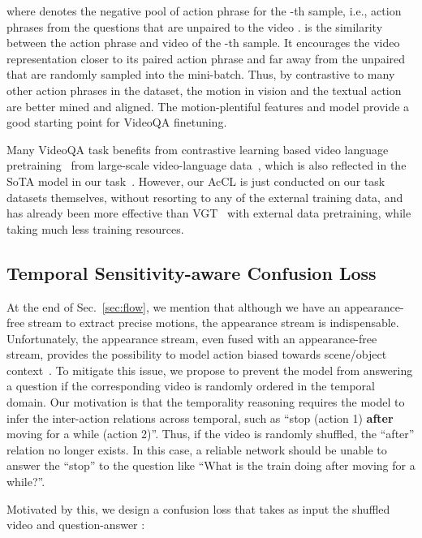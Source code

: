 \documentclass[sigconf]{acmart}
\begin{document}
where  denotes the negative pool of action phrase for the -th sample, i.e., action phrases from the questions that are unpaired to the video .  is the similarity between the action phrase  and video  of the -th sample. 
It encourages the video representation closer to its paired action phrase  and far away from the unpaired  that are randomly sampled into the mini-batch.
Thus, by contrastive to many other action phrases  in the dataset, the motion in vision and the textual action are better mined and aligned. The motion-plentiful features and model provide a good starting point for VideoQA finetuning.

Many VideoQA task benefits from contrastive learning based video language pretraining~\cite{lei2021less,zellers2021merlot} from large-scale video-language data~\cite{bain2021frozen}, which is also reflected in the SoTA model in our task~\cite{xiao2022vgt}. However, our AcCL is just conducted on our task datasets themselves, without resorting to any of the external training data, and has already been more effective than VGT~\cite{xiao2022vgt} with external data pretraining, while taking much less training resources.








\subsection{Temporal Sensitivity-aware Confusion Loss}
\label{sec:tsc}
At the end of Sec.~\ref{sec:flow}, we mention that although we have an appearance-free stream to extract precise motions, the appearance stream is indispensable.
Unfortunately, the appearance stream, even fused with an appearance-free stream, provides the possibility to model action biased towards scene/object context~\cite{choi2019can}.
To mitigate this issue, we propose to prevent the model from answering a question if the corresponding video is randomly ordered in the temporal domain.
Our motivation is that the temporality reasoning requires the model to infer the inter-action relations across temporal, such as ``stop (action 1) \textbf{after} moving for a while (action 2)''. Thus, if the video is randomly shuffled, the ``after'' relation no longer exists. In this case, a reliable network should be unable to answer the ``stop'' to the question like ``What is the train doing after moving for a while?''. 


Motivated by this, we design a confusion loss that takes as input the shuffled video  and question-answer :
\end{document}
